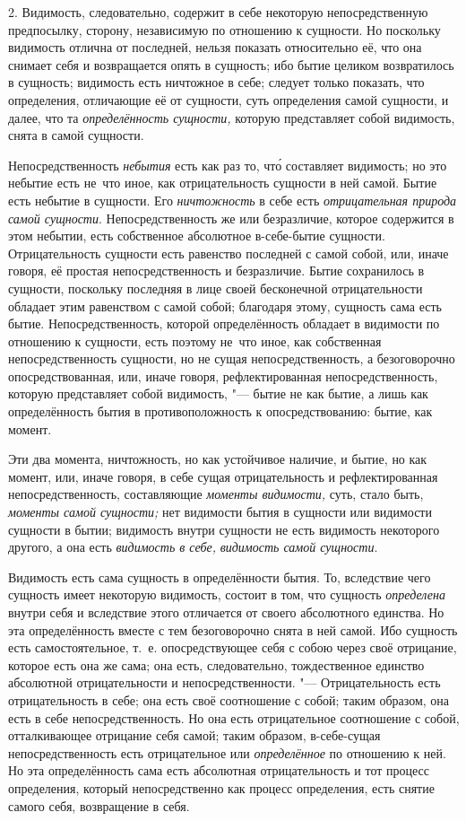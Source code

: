 2. Видимость, следовательно, содержит в себе некоторую непосредственную
предпосылку, сторону, независимую по отношению к сущности. Но поскольку
видимость отлична от последней, нельзя показать относительно её, что она
снимает себя и возвращается опять в сущность; ибо бытие целиком
возвратилось в сущность; видимость есть ничтожное в себе; следует только
показать, что определения, отличающие её от сущности, суть определения
самой сущности, и далее, что та {\em определённость
сущности,} которую представляет собой видимость, снята в самой сущности.

Непосредственность {\em небытия} есть как раз то, чт\'{о}
составляет видимость; но это небытие есть не~что иное, как отрицательность
сущности в ней самой. Бытие есть небытие в сущности. Его
{\em ничтожность} в себе есть
{\em отрицательная природа самой сущности}.
Непосредственность же или безразличие, которое содержится в этом небытии,
есть собственное абсолютное в-себе-бытие сущности. Отрицательность сущности
есть равенство последней с самой собой, или, иначе говоря, её простая
непосредственность и безразличие. Бытие сохранилось в сущности, поскольку
последняя в лице своей бесконечной отрицательности обладает этим равенством
с самой собой; благодаря этому, сущность сама есть бытие.
Непосредственность, которой определённость обладает в видимости по
отношению к сущности, есть поэтому не~что иное, как собственная
непосредственность сущности, но не сущая непосредственность, а
безоговорочно опосредствованная, или, иначе говоря, рефлектированная
непосредственность, которую представляет собой видимость, "--- бытие не как
бытие, а лишь как определённость бытия в противоположность к
опосредствованию: бытие, как момент.

Эти два момента, ничтожность, но как устойчивое наличие, и бытие, но как
момент, или, иначе говоря, в себе сущая отрицательность и рефлектированная
непосредственность, составляющие {\em моменты
видимости,} суть, стало быть, {\em моменты самой
сущности;} нет видимости бытия в сущности или видимости сущности в бытии;
видимость внутри сущности не есть видимость некоторого другого, а она есть
{\em видимость в себе,}
{\em видимость самой сущности}.

Видимость есть сама сущность в определённости бытия. То, вследствие чего
сущность имеет некоторую видимость, состоит в том, что сущность
{\em определена} внутри себя и вследствие этого
отличается от своего абсолютного единства. Но эта определённость вместе с
тем безоговорочно снята в ней самой. Ибо сущность есть самостоятельное,
т.~е. опосредствующее себя с собою через своё отрицание, которое есть она
же сама; она есть, следовательно, тождественное единство абсолютной
отрицательности и непосредственности. "--- Отрицательность есть
отрицательность в себе; она есть своё соотношение с собой; таким образом,
она есть в себе непосредственность. Но она есть отрицательное соотношение с
собой, отталкивающее отрицание себя самой; таким образом, в-себе-сущая
непосредственность есть отрицательное или
{\em определённое} по отношению к ней. Но эта
определённость сама есть абсолютная отрицательность и тот процесс
определения, который непосредственно как процесс определения, есть снятие
самого себя, возвращение в себя.

